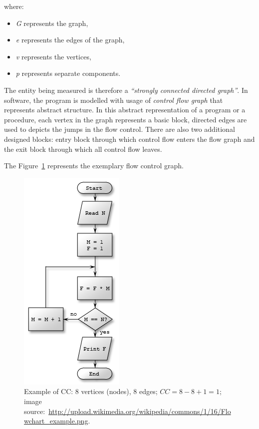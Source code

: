 where:
\begin{itemize}\addtolength{\itemsep}{-0.5\baselineskip}\vspace{-7mm}
\item \textit{G} represents the graph,
\item \textit{e} represents the edges of the graph,
\item \textit{v} represents the vertices,
\item \textit{p} represents separate components.
\end{itemize}

The entity being measured is therefore a \textit{``strongly connected directed graph''}. In software, the program is modelled with usage of \textit{control flow graph} that represents abstract structure. In this abstract representation of a program or a procedure, each vertex in the graph represents a basic block, directed edges are used to depicts the jumps in the flow control. There are also two additional designed blocks: entry block through which control flow enters the flow graph and the exit block through which all control flow leaves.  

The Figure~\ref{fig:cyclomatic_complexity} represents the exemplary flow control graph.

\begin{figure}[h!]
	\centering
	\includegraphics[scale=0.5]{img/cyclomatic_complexity.png} 
	\caption{Example of \ac{CC}: 8 vertices (nodes), 8 edges; $CC = 8 - 8 + 1 = 1$; image source:~\url{http://upload.wikimedia.org/wikipedia/commons/1/16/Flowchart_example.png}.}		
	\label{fig:cyclomatic_complexity}
\end{figure}

